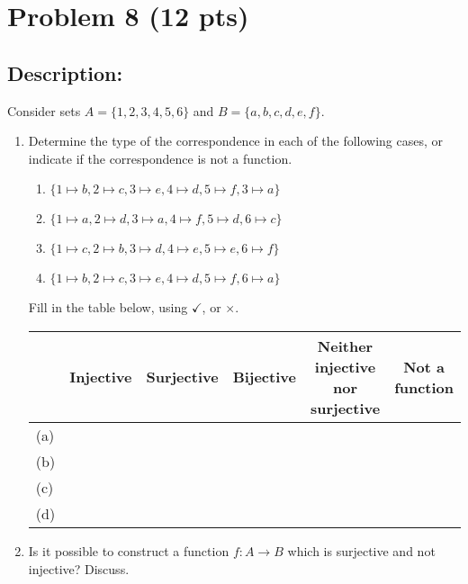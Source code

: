 \newpage


\section{Problem 8 (12 pts)}
\subsection{Description:}


Consider sets $A = \{1, 2, 3, 4, 5, 6 \}$ and $B = \{ a, b, c, d, e, f \}$.

\begin{enumerate}

\item Determine the type of the correspondence in each of the following cases, or indicate if the correspondence is not a function.

\begin{enumerate}
\item $\{ 1 \mapsto b, 2 \mapsto c, 3 \mapsto e, 4 \mapsto d, 5 \mapsto f, 3 \mapsto a \}$

\item $\{ 1 \mapsto a, 2 \mapsto d, 3 \mapsto a, 4 \mapsto f, 5 \mapsto d, 6 \mapsto c \}$

\item $\{ 1 \mapsto c, 2 \mapsto b, 3 \mapsto d, 4 \mapsto e, 5 \mapsto e, 6 \mapsto f  \}$

\item $\{ 1 \mapsto b, 2 \mapsto c, 3 \mapsto e, 4 \mapsto d, 5 \mapsto f, 6 \mapsto a \}$
\end{enumerate}

\noindent Fill in the table below, using $\checkmark$, or $\times$.

\begin{center}
\begin{tabular}{|l|c|c|c|c|c|}
\hline
		& Injective		& Surjective	& Bijective 	& \multicolumn{1}{m{3cm}|}{Neither injective nor surjective}	&	Not a function	\\
\hline
(a)		& 		& 		& 	& 			&  \\
\hline

(b)		& 		& 		& 		& 	&	 \\
\hline


(c)		& 		& 		& 		& 	&  \\
\hline

(d)		& 		& 		& 		&	&  \\
\hline
\end{tabular}
\end{center}


\item Is it possible to construct a function $f : A \rightarrow B$ which is surjective and not injective?  Discuss.
\end{enumerate}

